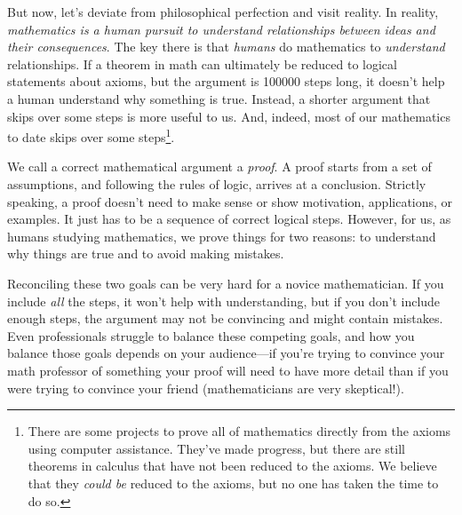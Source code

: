 	But now, let's deviate from philosophical perfection and visit reality.
	In reality, \emph{mathematics is a human pursuit to understand relationships
	between ideas and their consequences}.  The key there is that \emph{humans} do
	mathematics to \emph{understand} relationships.  If a theorem in math can
	ultimately be reduced to logical statements about axioms, but the argument is
	100000 steps long, it doesn't help a human understand why something is true.
	Instead, a shorter argument that skips over some steps is more useful to us.
	And, indeed, most of our mathematics to date skips over some steps\footnote{
		There are some projects to prove all of mathematics directly from
		the axioms using computer assistance.  They've made progress, but there
		are still theorems in calculus that have not been reduced to the
		axioms.  We believe that they \emph{could be} reduced to the axioms,
		but no one has taken the time to do so.}.

	We call a correct mathematical argument a \emph{proof}.  A proof starts
	from a set of assumptions, and following the rules of logic, arrives at a conclusion.
	Strictly speaking, a proof doesn't need to make sense or show motivation,
	applications, or examples.  It just has to be a sequence of correct logical steps.
	However, for us, as humans studying mathematics, we prove things for two reasons:
	to understand why things are true and to avoid making mistakes.

	Reconciling these two goals can be very hard for a novice mathematician.  If you include
	\emph{all} the steps, it won't help with understanding, but if you don't include enough
	steps, the argument may not be convincing and might contain mistakes.  
	Even professionals struggle to balance
	these competing goals, and how you balance those goals depends on your audience---if you're
	trying to convince your math professor of something your proof will need to have more
	detail than if you were trying to convince your friend (mathematicians are very skeptical!).

